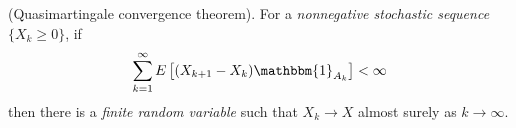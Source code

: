\begin{enumerate}
          \begin{theorem}{(Quasimartingale convergence theorem).}
            \label{thm:quasimartingale}
            For a \textit{nonnegative stochastic sequence} $\{X_{k} \ge 0\}$, if
            \begin{equation*}
              \sum_{k=1}^{\infty}E \left[(X_{k+1}-X_{k})\mathbbm{1}_{A_{k}}\right] < \infty
            \end{equation*}
            then there is a \textit{finite random variable} such that $X_{k} \to X$ almost surely as $k \to \infty$.
          \end{theorem}
  \end{enumerate}
